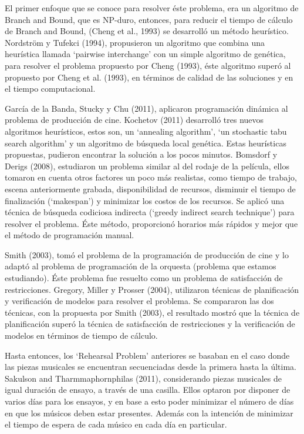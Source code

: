 \documentclass[journal, 10pt]{IEEEtran}
\begin{document}
El primer enfoque que se conoce para resolver éste problema, era un algoritmo de Branch and Bound, que es NP-duro, entonces, para reducir el tiempo de cálculo de Branch and Bound, (Cheng et al., 1993) se desarrolló un método heurístico\cite{ref1}. Nordström y Tufekci (1994)\cite{ref2}, propusieron un algoritmo que combina una heurística llamada `pairwise interchange' con un simple algoritmo de genética, para resolver el problema propuesto por Cheng (1993)\cite{ref1}, éste algoritmo superó al propuesto por Cheng et al. (1993)\cite{ref1}, en términos de calidad de las soluciones y en el tiempo computacional.

García de la Banda, Stucky y Chu (2011)\cite{ref3}, aplicaron programación dinámica al problema de producción de cine. Kochetov (2011)\cite{ref4} desarrolló tres nuevos algoritmos heurísticos, estos son, un `annealing algorithm', `un stochastic tabu search algorithm' y un algoritmo de búsqueda local genética. Estas heurísticas propuestas, pudieron encontrar la solución a los pocos minutos. Bomsdorf y Derigs (2008)\cite{ref5}, estudiaron un problema similar al del rodaje de la película, ellos tomaron en cuenta otros factores un poco más realistas, como tiempo de trabajo, escena anteriormente grabada, disponibilidad de recursos, disminuir el tiempo de finalización (`makespan') y minimizar los costos de los recursos. Se aplicó una técnica de búsqueda codiciosa indirecta (`greedy indirect search technique') para resolver el problema. Éste método, proporcionó horarios más rápidos y mejor que el método de programación manual.

Smith (2003)\cite{ref6}, tomó el problema de la programación de producción de cine y lo adaptó al problema de programación de la orquesta (problema que estamos estudiando). Éste problema fue resuelto como un problema de satisfacción de restricciones. Gregory, Miller y Prosser (2004)\cite{ref7}, utilizaron técnicas de planificación y verificación de modelos para resolver el problema. Se compararon las dos técnicas, con la propuesta por Smith (2003)\cite{ref6}, el resultado mostró que la técnica de planificación superó la técnica de satisfacción de restricciones y la verificación de modelos en términos de tiempo de cálculo.

Hasta entonces, los `Rehearsal Problem' anteriores se basaban en el caso donde las piezas musicales se encuentran secuenciadas desde la primera hasta la última. Sakulson and Tharmmaphornphilas (2011)\cite{ref8}, considerando piezas musicales de igual duración de ensayo, a través de una casilla. Ellos optaron por disponer de varios días para los ensayos, y en base a esto poder minimizar el número de días en que los músicos deben estar presentes. Además con la intención de minimizar el tiempo de espera de cada músico en cada día en particular.
\end{document}
